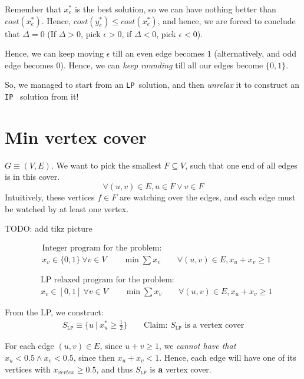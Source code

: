 \documentclass[11pt]{book}
\newcommand{\ip}{\texttt{IP} }
\newcommand{\lp}{\texttt{LP}}
\begin{document}
\begin{itemize}
        Remember that $x_e^*$ is the best solution, so we can have nothing
        better than $cost(x_e^*)$. Hence, $cost(y_e^*) \leq cost(x_e^*)$,
        and hence, we are forced to conclude that $\Delta = 0$ 
        (If $\Delta > 0$, pick $\epsilon > 0$, if $\Delta < 0$, pick $\epsilon
        < 0$). 

        Hence, we can keep moving $\epsilon$ till an even edge becomes $1$
        (alternatively, and odd edge becomes $0$). Hence, we can \textit{keep rounding}
        till all our edges become $\{0, 1\}$.
\end{itemize}

So, we managed to start from an \lp~solution, and then \textit{unrelax} it to
construct an \ip~solution from it!

\section{Min vertex cover}
$G\equiv (V, E)$. We want to pick the smallest $F \subseteq V$, such that one end
of all edges is in this cover.
\[ \forall (u, v) \in E, u \in F \lor v \in F \]
Intuitively, these vertices $f \in F$ are watching over the edges, and each
edge must be watched by at least one vertex.

TODO: add tikz picture


\begin{align*}
    &\text{Integer program for the problem:} \\
    &x_v \in \{0, 1\}~\forall v \in V \qquad
    \min \sum x_v \qquad
    \forall (u, v) \in E, x_u + x_v \geq 1
\end{align*}

\begin{align*}
    &\text{LP relaxed program for the problem:} \\
    &x_v \in [0, 1]~\forall v \in V \qquad
    \min \sum x_v \qquad
    \forall (u, v) \in E, x_u + x_v \geq 1
\end{align*}

From the LP, we construct:
\begin{align*}
    S_\lp \equiv \bigg\{ u ~\bigg|~ x_u^* \geq \frac{1}{2} \bigg\} \qquad
    \text{Claim: $S_\lp$ is a vertex cover}
\end{align*}

For each edge $(u, v) \in E$, since $u + v \geq 1$, we \textit{cannot have that}
$x_u < 0.5 \land x_v < 0.5$, since then $x_u + x_v < 1$. Hence, each
edge will have one of its vertices with $x_{vertex} \geq 0.5$, and thus
$S_\lp$ is \textbf{a} vertex cover.
\end{document}

